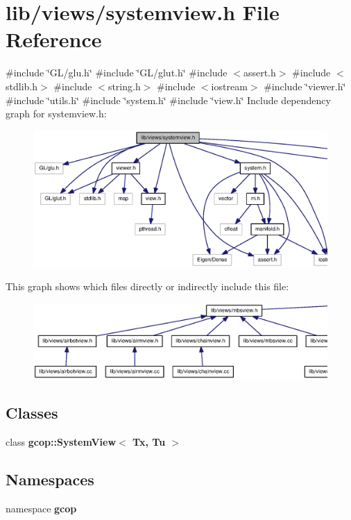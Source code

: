\section{lib/views/systemview.h \-File \-Reference}
\label{systemview_8h}
{\ttfamily \#include \char`\"{}\-G\-L/glu.\-h\char`\"{}}\*
{\ttfamily \#include \char`\"{}\-G\-L/glut.\-h\char`\"{}}\*
{\ttfamily \#include $<$assert.\-h$>$}\*
{\ttfamily \#include $<$stdlib.\-h$>$}\*
{\ttfamily \#include $<$string.\-h$>$}\*
{\ttfamily \#include $<$iostream$>$}\*
{\ttfamily \#include \char`\"{}viewer.\-h\char`\"{}}\*
{\ttfamily \#include \char`\"{}utils.\-h\char`\"{}}\*
{\ttfamily \#include \char`\"{}system.\-h\char`\"{}}\*
{\ttfamily \#include \char`\"{}view.\-h\char`\"{}}\*
\-Include dependency graph for systemview.\-h\-:\nopagebreak
\begin{figure}[H]
\begin{center}
\leavevmode
\includegraphics[width=350pt]{systemview_8h__incl}
\end{center}
\end{figure}
\-This graph shows which files directly or indirectly include this file\-:\nopagebreak
\begin{figure}[H]
\begin{center}
\leavevmode
\includegraphics[width=350pt]{systemview_8h__dep__incl}
\end{center}
\end{figure}
\subsection*{\-Classes}
\begin{DoxyCompactItemize}
\item 
class {\bf gcop\-::\-System\-View$<$ Tx, Tu $>$}
\end{DoxyCompactItemize}
\subsection*{\-Namespaces}
\begin{DoxyCompactItemize}
\item 
namespace {\bf gcop}
\end{DoxyCompactItemize}
